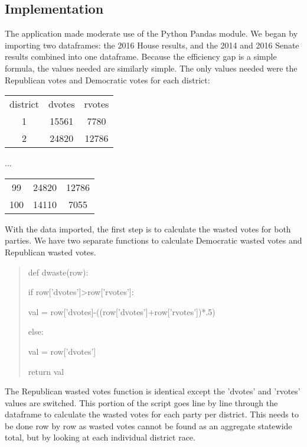 \documentclass[sigconf]{acmart}
\begin{document}
\subsection{Implementation}

The application made moderate use of the Python Pandas module. We began by importing two dataframes: the 2016 House results, and the 2014 and 2016 Senate results combined into one dataframe. Because the efficiency gap is a simple formula, the values needed are similarly simple. The only values needed were the Republican votes and Democratic votes for each district:

\begin{center}
\begin{tabular}{ |c|c|c| }
    district & dvotes & rvotes \\
    1 & 15561 & 7780 \\
    2 & 24820 & 12786 \\
\end{tabular}
\end{center}
\begin{center}
...
\end{center}
\begin{center}
\begin{tabular}{ |c|c|c| }
    99 & 24820 & 12786 \\
    100 & 14110 & 7055 \\
\end{tabular}
\end{center}

With the data imported, the first step is to calculate the wasted votes for both parties. We have two separate functions to calculate Democratic wasted votes and Republican wasted votes.
\begin{quote}
def dwaste(row):
    
    if row['dvotes']\textgreater row['rvotes']:
    
        val = row['dvotes]-((row['dvotes']+row['rvotes'])*.5)
    
    else:
    
        val = row['dvotes']
    
    return val
\end{quote}

The Republican wasted votes function is identical except the 'dvotes' and 'rvotes' values are switched. This portion of the script goes line by line through the dataframe to calculate the wasted votes for each party per district. This needs to be done row by row as wasted votes cannot be found as an aggregate statewide total, but by looking at each individual district race. 
\end{document}
